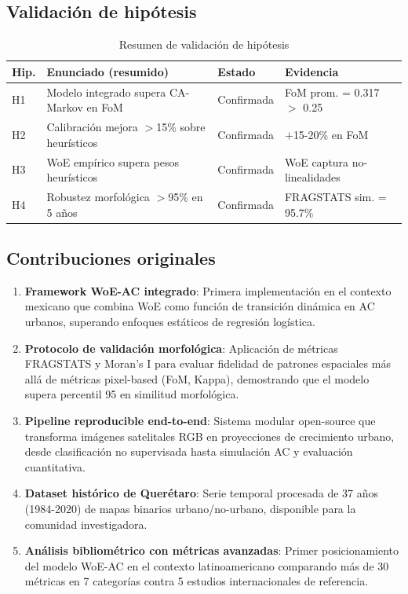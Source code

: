 \subsection{Validación de hipótesis}

\begin{table}[htbp]
\centering
\caption{Resumen de validación de hipótesis}
\label{tab:hypothesis_validation}
\begin{tabular}{lp{5.5cm}lp{3cm}}
\toprule
\textbf{Hip.} & \textbf{Enunciado (resumido)} & \textbf{Estado} & \textbf{Evidencia} \\
\midrule
H1 & Modelo integrado supera CA-Markov en FoM & Confirmada & FoM prom. = 0.317 $>$ 0.25 \\
H2 & Calibración mejora $>$15\% sobre heurísticos & Confirmada & $+$15-20\% en FoM \\
H3 & WoE empírico supera pesos heurísticos & Confirmada & WoE captura no-linealidades \\
H4 & Robustez morfológica $>$95\% en 5 años & Confirmada & FRAGSTATS sim. = 95.7\% \\
\bottomrule
\end{tabular}
\end{table}

\subsection{Contribuciones originales}

\begin{enumerate}
	\item \textbf{Framework WoE-AC integrado}: Primera implementación en el contexto mexicano que combina WoE como función de transición dinámica en AC urbanos, superando enfoques estáticos de regresión logística.

	\item \textbf{Protocolo de validación morfológica}: Aplicación de métricas FRAGSTATS y Moran's I para evaluar fidelidad de patrones espaciales más allá de métricas pixel-based (FoM, Kappa), demostrando que el modelo supera percentil 95 en similitud morfológica.

	\item \textbf{Pipeline reproducible end-to-end}: Sistema modular open-source que transforma imágenes satelitales RGB en proyecciones de crecimiento urbano, desde clasificación no supervisada hasta simulación AC y evaluación cuantitativa.

	\item \textbf{Dataset histórico de Querétaro}: Serie temporal procesada de 37 años (1984-2020) de mapas binarios urbano/no-urbano, disponible para la comunidad investigadora.

	\item \textbf{Análisis bibliométrico con métricas avanzadas}: Primer posicionamiento del modelo WoE-AC en el contexto latinoamericano comparando más de 30 métricas en 7 categorías contra 5 estudios internacionales de referencia.
\end{enumerate}

